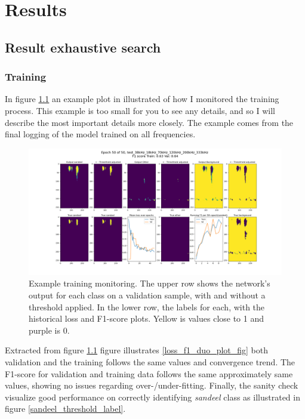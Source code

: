 \clearpage
\chapter{Results}

\section{Result exhaustive search}
    
    \subsection{Training}
        In figure \ref{training_overveiw_fig} an example plot in illustrated of how I monitored the training process. This example is too small for you to see any details, and so I will describe the most important details more closely. The example comes from the final logging of the model trained on all frequencies.
        \clearpage
        \begin{figure}[H]
            \centering
            \includegraphics[scale=0.3]{figures/epoch_50_test_38kHz_18kHz_70kHz_120kHz_200kHz_333kHz.png}
            \caption[Training example monitoring]{Example training monitoring. The upper row shows the network's output for each class on a validation sample, with and without a threshold applied. In the lower row, the labels for each, with the historical loss and F1-score plots. Yellow is values close to 1 and purple is 0.}
          	\medskip 
            \label{training_overveiw_fig}
        \end{figure}
        
        
        Extracted from figure \ref{training_overveiw_fig} figure illustrates
        \ref{loss_f1_duo_plot_fig} both validation and the training follows the same values and convergence trend. The F1-score for validation and training data follows the same approximately same values, showing no issues regarding over-/under-fitting. Finally, the sanity check visualize good performance on correctly identifying \textit{sandeel} class as illustrated in figure \ref{sandeel_threshold_label}.%
        
